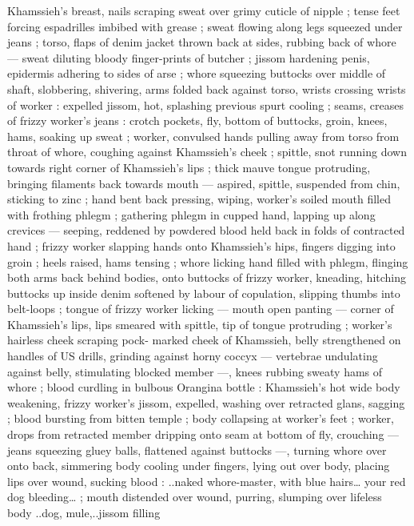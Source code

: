 Khamssieh's breast, nails scraping sweat over grimy cuticle of nipple 
; tense feet forcing espadrilles imbibed with grease ; sweat flowing 
along legs squeezed under jeans ; torso, flaps of denim jacket 
thrown back at sides, rubbing back of whore --- sweat diluting 
bloody finger-prints of butcher ; jissom hardening penis, epidermis 
adhering to sides of arse ; whore squeezing buttocks over middle of 
shaft, slobbering, shivering, arms folded back against torso, wrists 
crossing wrists of worker : expelled jissom, hot, splashing previous 
spurt cooling ; seams, creases of frizzy worker's jeans : crotch 
pockets, fly, bottom of buttocks, groin, knees, hams, soaking up 
sweat ; worker, convulsed hands pulling away from torso from throat 
of whore, coughing against Khamssieh's cheek ; spittle, snot 
running down towards right corner of Khamssieh's lips ; thick mauve 
tongue protruding, bringing filaments back towards mouth --- 
aspired, spittle, suspended from chin, sticking to zinc ; hand bent 
back pressing, wiping, worker's soiled mouth filled with frothing 
phlegm ; gathering phlegm in cupped hand, lapping up along 
crevices --- seeping, reddened by powdered blood held back in folds 
of contracted hand ; frizzy worker slapping hands onto Khamssieh's 
hips, fingers digging into groin ; heels raised, hams tensing ; whore 
licking hand filled with phlegm, flinging both arms back behind 
bodies, onto buttocks of frizzy worker, kneading, hitching buttocks 
up inside denim softened by labour of copulation, slipping thumbs 
into belt-loops ; tongue of frizzy worker licking --- mouth open 
panting --- corner of Khamssieh's lips, lips smeared with spittle, tip 
of tongue protruding ; worker's hairless cheek scraping pock- 
marked cheek of Khamssieh, belly strengthened on handles of US 
drills, grinding against horny coccyx --- vertebrae undulating against 
belly, stimulating blocked member ---, knees rubbing sweaty hams of 
whore ; blood curdling in bulbous Orangina bottle : Khamssieh's hot 
wide body weakening, frizzy worker's jissom, expelled, washing over 
retracted glans, sagging ; blood bursting from bitten temple ; body 
collapsing at worker's feet ; worker, drops from retracted member 
dripping onto seam at bottom of fly, crouching --- jeans squeezing 
gluey balls, flattened against buttocks ---, turning whore over onto 
back, simmering body cooling under fingers, lying out over body, 
placing lips over wound, sucking blood : {\gl}..naked whore-master, with 
blue hairs{\ldots} your red dog bleeding{\ldots}{\gr} ; mouth distended over wound, 
purring, slumping over lifeless body{\td} {\gl}..dog, mule,..jissom filling 
